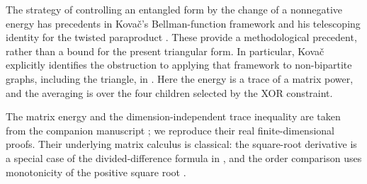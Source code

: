 The strategy of controlling an entangled form by the change of a
nonnegative energy has precedents in Kova\v{c}'s Bellman-function
framework \cite[Section~2]{Kovac2011} and his telescoping identity
for the twisted paraproduct \cite[Lemma~2]{Kovac2012}.
These provide a methodological precedent, rather than a bound for the
present triangular form. In particular, Kova\v{c} explicitly identifies
the obstruction to applying that framework to non-bipartite graphs,
including the triangle, in \cite[Section~6.2]{Kovac2011}.
Here the energy is a trace of a matrix power, and the averaging is
over the four children selected by the XOR constraint.

The matrix energy and the dimension-independent trace inequality are
taken from the companion manuscript \cite[Sections~2--3, Lemmas~2.1,
2.2 and~3.1]{OpenAI2026}; we reproduce their real finite-dimensional
proofs. Their underlying matrix calculus is classical: the
square-root derivative is a special case of the divided-difference
formula in \cite[Section~1, Equation~(1)]{Daletskii1957}, and the order
comparison uses monotonicity of the positive square root
\cite[Theorem, p.~309]{Pedersen1972}.

